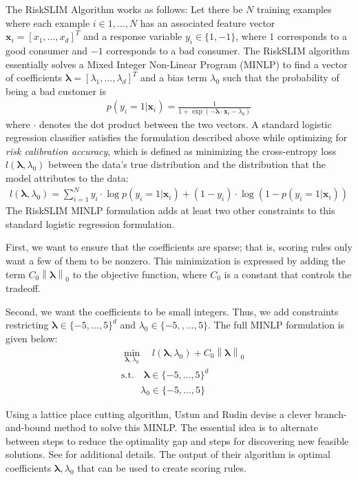 \documentclass[11pt, margin=1in]{article}
\newcommand{\vect}[1]{\boldsymbol{#1}}
\newcommand{\norm}[1]{\left\lVert#1\right\rVert}
\begin{document}
The RiskSLIM Algorithm works as follows: Let there be $N$ training examples where each example $i \in 1, \ldots, N$ has an associated feature vector $\vect{x}_i = [x_1, \ldots, x_d]^T$ and a response variable $y_i \in \{1, -1\}$, where $1$ corresponds to a good consumer and $-1$ corresponds to a bad consumer.  The RiskSLIM algorithm essentially solves a Mixed Integer Non-Linear Program (MINLP) to find a vector of coefficients $\vect{\lambda} = [\lambda_1, \ldots, \lambda_d]^T$ and a bias term $\lambda_0$ such that the probability of being a bad customer is
\begin{align*}
p(y_i = 1 \vert \vect{x}_i) = \frac{1}{1 + \exp(- \vect{\lambda} \cdot \vect{x}_i - \lambda_0)}
\end{align*}
where $\cdot$ denotes the dot product between the two vectors.  A standard logistic regression classifier satisfies the formulation described above while optimizing for \emph{risk calibration accuracy}, which is defined as minimizing the cross-entropy loss $l(\vect{\lambda}, \lambda_0)$ between the data's true distribution and the distribution that the model attributes to the data:
\begin{align*}
l(\vect{\lambda}, \lambda_0) = \sum_{i=1}^N y_i \cdot \log p(y_i = 1 \vert \vect{x}_i) + (1 - y_i) \cdot \log (1 - p(y_i = 1 \vert \vect{x}_i)) 
\end{align*}     
The RiskSLIM MINLP formulation adds at least two other constraints to this standard logistic regression formulation.  

First, we want to ensure that the coefficients are sparse; that is, scoring rules only want a few of them to be nonzero.  This minimization is expressed by adding the term $C_0 \norm{\vect{\lambda}}_0$ to the objective function, where $C_0$ is a constant that controls the tradeoff.    

Second, we want the coefficients to be small integers.  Thus, we add constraints restricting $\vect{\lambda} \in \{-5, \ldots, 5\}^d$ and $\lambda_0 \in \{-5, ,\ldots, 5\}$.  The full MINLP formulation is given below: 
\begin{align*}
&\min_{\vect{\lambda}, \lambda_0} \quad l(\vect{\lambda}, \lambda_0) + C_0 \norm{\vect{\lambda}}_0 \\
&\text{s.t.} \quad \vect{\lambda} \in \{-5, \ldots, 5\}^d \\
&\quad \quad \lambda_0 \in \{-5, \ldots, 5\}
\end{align*}       

Using a lattice place cutting algorithm, Ustun and Rudin devise a clever branch-and-bound method to solve this MINLP.  The essential idea is to alternate between steps to reduce the optimality gap and steps for discovering new feasible solutions.  See \cite{risk-slim} for additional details.  The output of their algorithm is optimal coefficients $\vect{\lambda}, \lambda_0$ that can be used to create scoring rules.  
\end{document}
